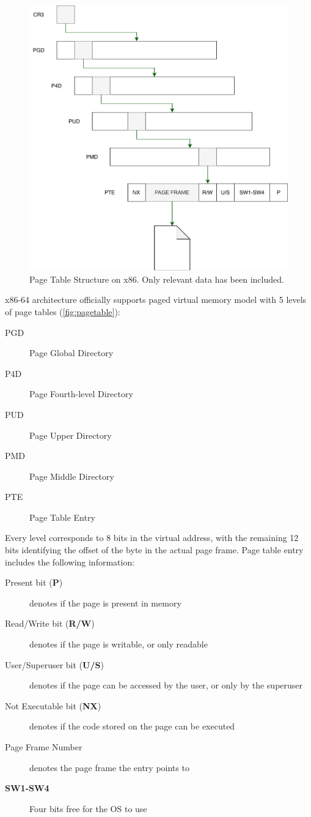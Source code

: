 \begin{figure}[]
  \centering
  \includegraphics[width = .35 \textwidth]{img/pagetable.pdf}
  \caption{Page Table Structure on x86. Only relevant data has been included.}
  \label{fig:pagetable}
\end{figure}
x86-64 architecture officially supports paged virtual memory model with 5 levels of page tables (\autoref{fig:pagetable}):
\begin{description}
    \item[PGD] Page Global Directory
    \item[P4D] Page Fourth-level Directory
    \item[PUD] Page Upper Directory
    \item[PMD] Page Middle Directory
    \item[PTE] Page Table Entry
\end{description}

Every level corresponds to 8 bits in the virtual address, with the remaining 12 bits identifying the offset of the byte in the actual page frame.
Page table entry includes the following information:
\begin{description}
    \item[Present bit (\textbf{P})] denotes if the page is present in memory
    \item[Read/Write bit (\textbf{R/W})] denotes if the page is writable, or only readable
    \item[User/Superuser bit (\textbf{U/S})] denotes if the page can be accessed by the user, or only by the superuser
    \item[Not Executable bit (\textbf{NX})] denotes if the code stored on the page can be executed
    \item[Page Frame Number] denotes the page frame the entry points to
    \item[\textbf{SW1-SW4}] Four bits free for the OS to use
\end{description}

